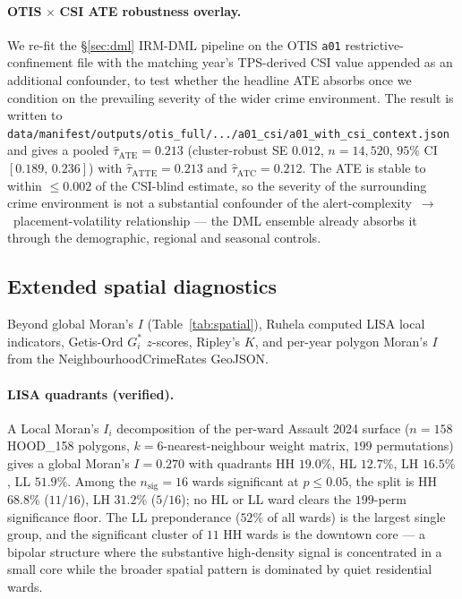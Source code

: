 \documentclass[article,shortnames,nojss]{jss}
\begin{document}
\paragraph{OTIS$\,\times\,$CSI ATE robustness overlay.}
We re-fit the §\ref{sec:dml} IRM-DML pipeline on the OTIS
\texttt{a01} restrictive-confinement file with the matching
year's TPS-derived CSI value appended as an additional confounder,
to test whether the headline ATE absorbs once we condition on the
prevailing severity of the wider crime environment.  The result is
written to
\texttt{data/manifest/outputs/otis\_full/.../a01\_csi/a01\_with\_csi\_context.json}
and gives a pooled $\hat\tau_{\text{ATE}} = 0.213$ (cluster-robust
SE $0.012$, $n=14{,}520$, $95\%$ CI $[0.189,\,0.236]$) with
$\hat\tau_{\text{ATTE}}=0.213$ and $\hat\tau_{\text{ATC}}=0.212$.
The ATE is stable to within $\le 0.002$ of the CSI-blind estimate,
so the severity of the surrounding crime environment is not a
substantial confounder of the alert-complexity~$\to$~placement-volatility
relationship — the DML ensemble already absorbs it through the
demographic, regional and seasonal controls.

\subsection{Extended spatial diagnostics}\label{phys-spatial-extended}

Beyond global Moran's $I$ (Table~\ref{tab:spatial}), Ruhela computed
LISA local indicators, Getis-Ord $G^\ast_i$ $z$-scores, Ripley's
$K$, and per-year polygon Moran's $I$ from the
NeighbourhoodCrimeRates GeoJSON.

\paragraph{LISA quadrants (verified).}  A Local Moran's $I_i$
decomposition of the per-ward Assault 2024 surface ($n=158$
HOOD\_158 polygons, $k=6$-nearest-neighbour weight matrix,
$199$ permutations) gives a global Moran's $I = 0.270$ with
quadrants HH $19.0\%$, HL $12.7\%$, LH $16.5\%$, LL $51.9\%$.
Among the $n_{\text{sig}}=16$ wards significant at $p\le 0.05$,
the split is HH $68.8\%$ ($11/16$), LH $31.2\%$ ($5/16$); no
HL or LL ward clears the $199$-perm significance floor.  The
LL preponderance ($52\%$ of all wards) is the largest single
group, and the significant cluster of $11$ HH wards is the
downtown core --- a bipolar structure
where the substantive high-density signal is concentrated in a
small core while the broader spatial pattern is dominated by
quiet residential wards.
\end{document}
